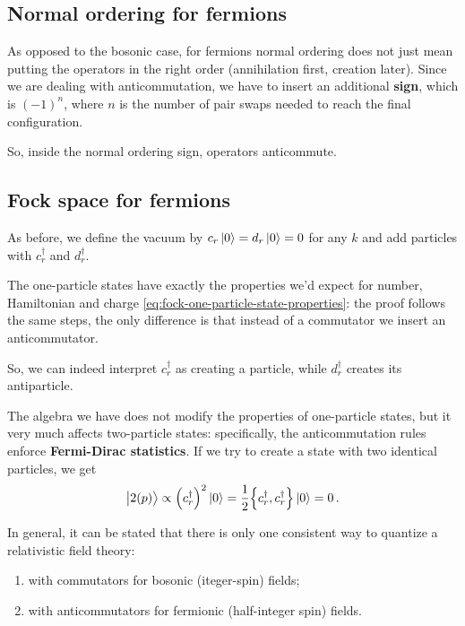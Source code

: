 \documentclass[main.tex]{subfiles}
\begin{document}
\subsection{Normal ordering for fermions}

As opposed to the bosonic case, for fermions normal ordering does not just mean putting the operators in the right order (annihilation first, creation later). Since we are dealing with anticommutation, we have to insert an additional \textbf{sign}, which is \((-1)^{n}\), where \(n\) is the number of pair swaps needed to reach the final configuration. 

So, inside the normal ordering sign, operators anticommute.

\subsection{Fock space for fermions}

As before, we define the vacuum by \(c_r \ket{0} = d_r \ket{0} = 0\) for any \(k\) and add particles with \(c_r ^\dag\) and \(d_r ^\dag\).

The one-particle states have exactly the properties we'd expect for number, Hamiltonian and charge \eqref{eq:fock-one-particle-state-properties}: the proof follows the same steps, the only difference is that instead of a commutator we insert an anticommutator. 

So, we can indeed interpret \(c_r ^\dag\) as creating a particle, while \(d_r ^\dag\) creates its antiparticle. 

The algebra we have does not modify the properties of one-particle states, but it very much affects two-particle states: specifically, the anticommutation rules enforce \textbf{Fermi-Dirac statistics}. If we try to create a state with two identical particles, we get 
%
\begin{align}
\ket{2(p)} \propto \qty(c_r ^\dag)^2 \ket{0} = \frac{1}{2} \qty{c_r ^\dag, c_r ^\dag} \ket{0} = 0
\,.
\end{align}

In general, it can be stated that there is only one consistent way to quantize a relativistic field theory: 
\begin{enumerate}
    \item with commutators for bosonic (iteger-spin) fields;
    \item with anticommutators for fermionic (half-integer spin) fields.
\end{enumerate}
\end{document}
